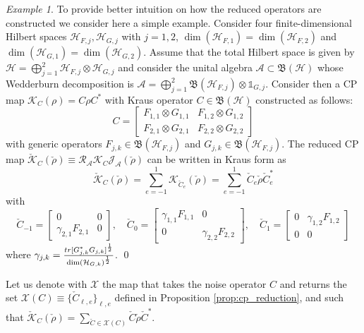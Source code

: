 \documentclass[aihp,12pt]{imsart}
\newcommand{\Hc}{\mathcal{H}}
\newcommand{\Jc}{\mathcal{J}}
\newcommand{\Rc}{\mathcal{R}}
\newcommand{\Kc}{\mathcal{K}}
\newcommand{\Xc}{\mathcal{X}}
\newcommand{\As}{\mathscr{A}}
\newcommand{\Bf}{\mathfrak{B}}
\newcommand{\um}{\frac{1}{2}}
\newcommand{\one}{\mathbb{1}}
\newcommand{\tr}{{\rm tr}}
\theoremstyle{theorem}
\theoremstyle{definition}
\theoremstyle{remark}
\newtheorem{example}{Example}
\begin{document}
\begin{example}
    To provide better intuition on how the reduced operators are constructed we consider here a simple example. Consider four finite-dimensional Hilbert spaces $\Hc_{F,j},\Hc_{G,j}$ with $j=1,2$, $\dim(\Hc_{F,1}) = \dim(\Hc_{F,2})$ and $\dim(\Hc_{G,1}) = \dim(\Hc_{G,2})$. Assume that the total Hilbert space is given by $\Hc=\bigoplus_{j=1}^2 \Hc_{F,j}\otimes\Hc_{G,j}$ and consider the unital algebra $\As\subset\Bf(\Hc)$ whose Wedderburn decomposition is $\As = \bigoplus_{j=1}^2 \Bf(\Hc_{F,j}) \otimes \one_{G,j}$. Consider then a CP map $\Kc_{C}(\rho) = C\rho C^*$ with Kraus operator $C\in\Bf(\Hc)$ constructed as follows:
    \[C=\left[\begin{array}{c|c}
         F_{1,1}\otimes G_{1,1}& F_{1,2}\otimes G_{1,2} \\\hline
         F_{2,1}\otimes G_{2,1}& F_{2,2}\otimes G_{2,2}
    \end{array}\right]\]
    with generic operators $F_{j,k}\in\Bf(\Hc_{F,j})$ and $G_{j,k}\in\Bf(\Hc_{F,j}).$ The reduced CP map $\check{\Kc}_C(\check{\rho}) \equiv \Rc_\As \Kc_C \Jc_\As(\check{\rho})$ can be written in Kraus form as \[\check{\Kc}_{C}(\check{\rho}) = \sum_{e=-1}^1 \Kc_{\check{C}_e}(\check{\rho}) = \sum_{e=-1}^1 \check{C}_e \check{\rho} \check{C}_e^*\] with 
    \[\check{C}_{-1} = \left[\begin{array}{c|c}
         0& 0 \\\hline
         \gamma_{2,1}F_{2,1}& 0
    \end{array}\right],\quad
    \check{C}_{0} = \left[\begin{array}{c|c}
         \gamma_{1,1}F_{1,1}& 0 \\\hline
         0& \gamma_{2,2}F_{2,2}
    \end{array}\right],\quad
    \check{C}_{1} = \left[\begin{array}{c|c}
         0& \gamma_{1,2}F_{1,2} \\\hline
         0& 0
    \end{array}\right]\]
    where $\gamma_{j,k} = \frac{\tr[G_{j,k}^* G_{j,k}]^\um}{\dim(\Hc_{G,k})^\um}$. 
\qed
\end{example}

Let us denote with $\Xc$ the map that takes the noise operator $C$ and returns the set $\Xc(C)\equiv\{\check{C}_{\ell,e}\}_{\ell,e}$ defined in Proposition \ref{prop:cp_reduction}, and such that $\check{\Kc}_C(\check{\rho}) = \sum_{\check{C}\in\Xc(C)} \check{C} \check{\rho} \check{C}^*$. 
\end{document}
